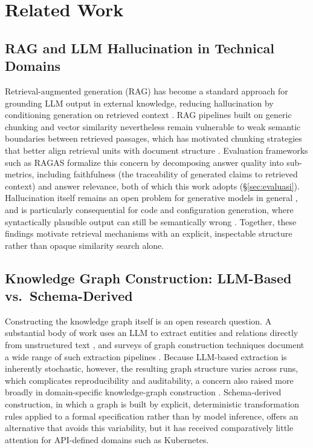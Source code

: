 \documentclass{ieeeaccess}
\begin{document}
\section{Related Work}
\label{sec:related}

\subsection{RAG and LLM Hallucination in Technical Domains}

Retrieval-augmented generation (RAG) has become a standard approach for grounding LLM output in external knowledge, reducing hallucination by conditioning generation on retrieved context \cite{rag_survey}. RAG pipelines built on generic chunking and vector similarity nevertheless remain vulnerable to weak semantic boundaries between retrieved passages, which has motivated chunking strategies that better align retrieval units with document structure \cite{moreno2025rag}. Evaluation frameworks such as RAGAS \cite{es_ragas_2023} formalize this concern by decomposing answer quality into sub-metrics, including faithfulness (the traceability of generated claims to retrieved context) and answer relevance, both of which this work adopts (\S\ref{sec:evaluasi}). Hallucination itself remains an open problem for generative models in general \cite{ji_hallucination_2023}, and is particularly consequential for code and configuration generation, where syntactically plausible output can still be semantically wrong \cite{liu2024deepanalysis}. Together, these findings motivate retrieval mechanisms with an explicit, inspectable structure rather than opaque similarity search alone.

\subsection{Knowledge Graph Construction: LLM-Based vs.\ Schema-Derived}

Constructing the knowledge graph itself is an open research question. A substantial body of work uses an LLM to extract entities and relations directly from unstructured text \cite{pan2024unifying,ma_llm_kg_2025}, and surveys of graph construction techniques document a wide range of such extraction pipelines \cite{hofer2024construction}. Because LLM-based extraction is inherently stochastic, however, the resulting graph structure varies across runs, which complicates reproducibility and auditability, a concern also raised more broadly in domain-specific knowledge-graph construction \cite{abusalih2021domain}. Schema-derived construction, in which a graph is built by explicit, deterministic transformation rules applied to a formal specification rather than by model inference, offers an alternative that avoids this variability, but it has received comparatively little attention for API-defined domains such as Kubernetes.
\end{document}
